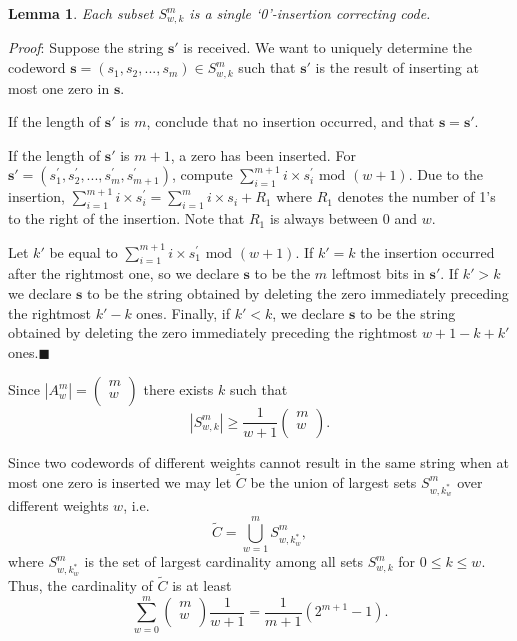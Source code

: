 \documentclass[10pt,conference]{IEEEtran}
\newtheorem{lemma}{Lemma}
\begin{document}
\begin{lemma}Each subset $S_{w,k}^m$ is a single `0'-insertion correcting
code.\end{lemma} \textit{Proof}: Suppose the string $\mathbf{s'}$
is received. We want to uniquely determine the codeword
$\mathbf{s}=(s_1,s_2,...,s_m) \in S_{w,k}^m$ such that
$\mathbf{s'}$ is the result of inserting at most one zero in
$\mathbf{s}$.

If the length of $\mathbf{s'}$ is $m$, conclude that no insertion
occurred, and that $\mathbf{s}=\mathbf{s'}$.

If the length of $\mathbf{s'}$ is $m+1$, a zero has been inserted.
For $\mathbf{s'}=(s_1^{'},s_2^{'},...,s_m^{'},s_{m+1}^{'})$, compute
$\sum_{i=1}^{m+1} i \times s_i^{'} \text{ mod } (w+1)$. Due to the
insertion, $\sum_{i=1}^{m+1} i \times s_i^{'}= \sum_{i=1}^{m} i
\times s_i + R_1$ where $R_1$ denotes the number of 1's to the right
of the insertion. Note that $R_1$ is always between $0$ and $w$.

Let $k'$ be equal to $\sum_{i=1}^{m+1} i \times s_1^{'} \text{ mod }
(w+1)$. If $k'=k$ the insertion occurred after the rightmost one, so
we declare $\mathbf{s}$ to be the $m$ leftmost bits in
$\mathbf{s'}$. If $k'>k$ we declare $\mathbf{s}$ to be the string
obtained by deleting the zero immediately preceding the rightmost
$k'-k$ ones.  Finally, if $k'< k$, we declare $\mathbf{s}$ to be the
string obtained by deleting the zero immediately preceding the
rightmost $w+1-k+k'$ ones.\hfill$\blacksquare$

\vspace{0.2in} Since $|A_w^m| = \left( \begin{array}{c}
                             m \\
                             w \\
                           \end{array}
                           \right)$ there exists $k$ such that
                           \[|S_{w,k}^m | \geq \frac{1}{w+1}
\left( \begin{array}{c}
                             m \\
                             w \\
                           \end{array}
                           \right).\]

Since two codewords of different weights cannot result in the same
string when at most one zero is inserted we may let $\tilde{C}$ be
the union of largest sets $S_{w,k^*_w}^m$ over different weights
$w$,
i.e. \[\tilde{C}=\bigcup_{w=1}^{m} S_{w,k^*_w}^m,\] where
$S_{w,k^*_w}^m$
is the set of largest cardinality among all sets $S_{w,k}^m$ for
$0\leq k\leq w$. Thus, the cardinality of $\tilde{C}$ is at least
\[\sum_{w=0}^m \left(
\begin{array}{c}
                             m \\
                             w \\
                           \end{array}
                           \right) \frac{1}{w+1}=\frac{1}{m+1}
                           \left(2^{m+1}-1\right).\]
\end{document}

